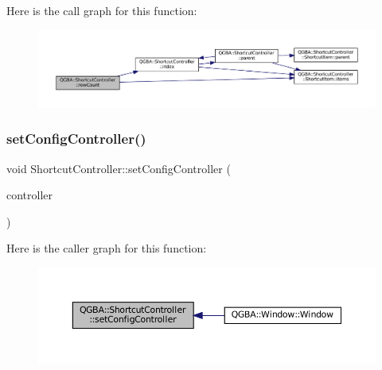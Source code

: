 Here is the call graph for this function\+:
\nopagebreak
\begin{figure}[H]
\begin{center}
\leavevmode
\includegraphics[width=350pt]{class_q_g_b_a_1_1_shortcut_controller_a21899ce0d6770d987af3f0ae299a2de8_cgraph}
\end{center}
\end{figure}
\mbox{\label{class_q_g_b_a_1_1_shortcut_controller_a67a2b7ce2e4d61339b64278144fc3156}} 
\subsubsection{\texorpdfstring{set\+Config\+Controller()}{setConfigController()}}
{\footnotesize\ttfamily void Shortcut\+Controller\+::set\+Config\+Controller (\begin{DoxyParamCaption}\item[{\mbox{\hyperlink{class_q_g_b_a_1_1_config_controller}{Config\+Controller}} $\ast$}]{controller }\end{DoxyParamCaption})}

Here is the caller graph for this function\+:
\nopagebreak
\begin{figure}[H]
\begin{center}
\leavevmode
\includegraphics[width=350pt]{class_q_g_b_a_1_1_shortcut_controller_a67a2b7ce2e4d61339b64278144fc3156_icgraph}
\end{center}
\end{figure}
\mbox{\label{class_q_g_b_a_1_1_shortcut_controller_a69946ee1097285bd64477642dc6be7fd}} 
